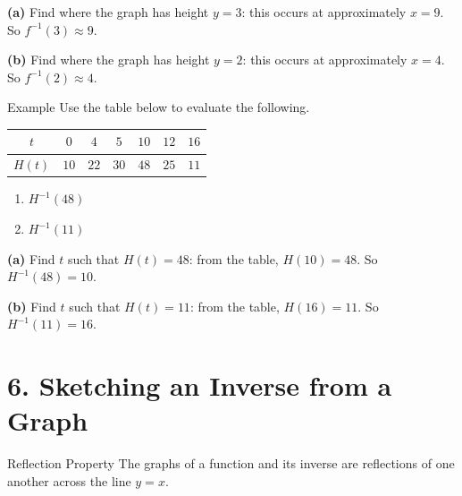 \documentclass[12pt]{article}
\newcounter{examplenum}
\newenvironment{friendlyex}{%
    \refstepcounter{examplenum}%
    \begin{friendlyexbox}{Example \theexamplenum}%
}{%
    \end{friendlyexbox}%
}
\begin{document}
\begin{solutionbox}
\textbf{(a)} Find where the graph has height $y=3$: this occurs at approximately $x=9$. So $f^{-1}(3)\approx 9$.

\textbf{(b)} Find where the graph has height $y=2$: this occurs at approximately $x=4$. So $f^{-1}(2)\approx 4$.
\end{solutionbox}

\begin{friendlyex}{}
Use the table below to evaluate the following.

\begin{center}
\begin{tabular}{|c|c|c|c|c|c|c|}
\hline
$t$ & $0$ & $4$ & $5$ & $10$ & $12$ & $16$ \\
\hline
$H(t)$ & $10$ & $22$ & $30$ & $48$ & $25$ & $11$ \\
\hline
\end{tabular}
\end{center}

\begin{enumerate}[label=(\alph*)]
    \item $H^{-1}(48)$
    \item $H^{-1}(11)$
\end{enumerate}
\end{friendlyex}

\begin{solutionbox}
\textbf{(a)} Find $t$ such that $H(t)=48$: from the table, $H(10)=48$. So $H^{-1}(48)=10$.

\textbf{(b)} Find $t$ such that $H(t)=11$: from the table, $H(16)=11$. So $H^{-1}(11)=16$.
\end{solutionbox}

\section*{6. Sketching an Inverse from a Graph}

\begin{friendlyrule}{Reflection Property}
The graphs of a function and its inverse are reflections of one another across the line $y=x$.
\end{friendlyrule}

\begin{center}
\end{center}
\end{document}
